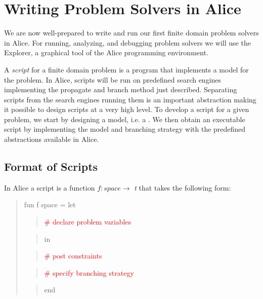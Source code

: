 \documentclass[a4paper]{scrartcl}
\begin{document}
\newpage
\section{Writing Problem Solvers in Alice}

We are now well-prepared to write and run our first finite 
domain problem solvers in Alice. 
For running, analyzing, and debugging problem solvers we 
will use the Explorer, a graphical 
tool of the Alice programming environment.\\
\par
A {\it script} for a finite domain problem is a program 
that implements a model for the problem. 
In Alice, scripts will be run on predefined 
search engines implementing the propagate 
and branch method just described. Separating scripts 
from the search engines running them 
is an important abstraction making it possible to design 
scripts at a very high level. To 
develop a script for a given problem, we start by designing 
a model, i.e. a . 
We then obtain an executable script by implementing the model 
and branching strategy with the 
predefined abstractions available in Alice. 


\subsection{Format of Scripts}
In Alice a script is a function $ f : space \rightarrow $ {\it t} 
that takes the following form:\\
\begin{quote}
fun f space = let
\begin{quote}
\hspace{15mm}\textcolor{red}{\# declare problem variables}
\end{quote} 
\begin{quote}
\hspace{15mm} in
\end{quote} 
\begin{quote}
\hspace{15mm}\textcolor{red}{\# post constraints}
\end{quote} 
\begin{quote}
\hspace{15mm}\textcolor{red}{\# specify branching strategy}
\end{quote} 
\begin{quote}
\hspace{15mm}end
\end{quote}             
\end{quote}
\end{document}
